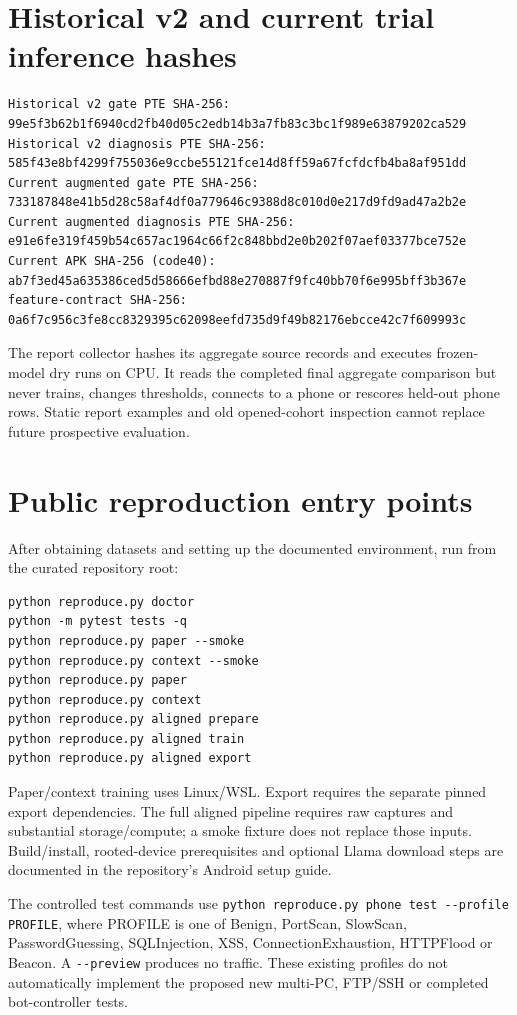 \documentclass[11pt,a4paper,oneside]{report}
\newcommand{\code}[1]{\nolinkurl{#1}}
\begin{document}
\section{Historical v2 and current trial inference hashes}
\begin{lstlisting}
Historical v2 gate PTE SHA-256:
99e5f3b62b1f6940cd2fb40d05c2edb14b3a7fb83c3bc1f989e63879202ca529
Historical v2 diagnosis PTE SHA-256:
585f43e8bf4299f755036e9ccbe55121fce14d8ff59a67fcfdcfb4ba8af951dd
Current augmented gate PTE SHA-256:
733187848e41b5d28c58af4df0a779646c9388d8c010d0e217d9fd9ad47a2b2e
Current augmented diagnosis PTE SHA-256:
e91e6fe319f459b54c657ac1964c66f2c848bbd2e0b202f07aef03377bce752e
Current APK SHA-256 (code40):
ab7f3ed45a635386ced5d58666efbd88e270887f9fc40bb70f6e995bff3b367e
feature-contract SHA-256:
0a6f7c956c3fe8cc8329395c62098eefd735d9f49b82176ebcce42c7f609993c
\end{lstlisting}
The report collector hashes its aggregate source records and executes frozen-model dry runs on CPU. It reads the completed final aggregate comparison but never trains, changes thresholds, connects to a phone or rescores held-out phone rows. Static report examples and old opened-cohort inspection cannot replace future prospective evaluation.

\section{Public reproduction entry points}
After obtaining datasets and setting up the documented environment, run from the curated repository root:
\begin{lstlisting}
python reproduce.py doctor
python -m pytest tests -q
python reproduce.py paper --smoke
python reproduce.py context --smoke
python reproduce.py paper
python reproduce.py context
python reproduce.py aligned prepare
python reproduce.py aligned train
python reproduce.py aligned export
\end{lstlisting}
Paper/context training uses Linux/WSL. Export requires the separate pinned export dependencies. The full aligned pipeline requires raw captures and substantial storage/compute; a smoke fixture does not replace those inputs. Build/install, rooted-device prerequisites and optional Llama download steps are documented in the repository's Android setup guide.

The controlled test commands use \code{python reproduce.py phone test --profile PROFILE}, where PROFILE is one of Benign, PortScan, SlowScan, PasswordGuessing, SQLInjection, XSS, ConnectionExhaustion, HTTPFlood or Beacon. A \code{--preview} produces no traffic. These existing profiles do not automatically implement the proposed new multi-PC, FTP/SSH or completed bot-controller tests.
\end{document}
